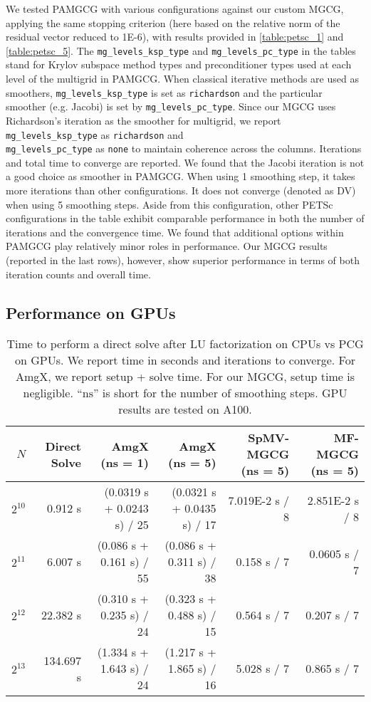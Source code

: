 We tested PAMGCG with various configurations against our custom MGCG, applying the same stopping criterion (here based on the relative norm of the residual vector reduced to 1E-6), with results provided in \autoref{table:petsc_1} and \autoref{table:petsc_5}.
The \texttt{mg\_levels\_ksp\_type} and \texttt{mg\_levels\_pc\_type} in the tables stand for Krylov subspace method types and preconditioner types used at each level of the multigrid in PAMGCG. When classical iterative methods are used as smoothers, \texttt{mg\_levels\_ksp\_type} is set as \texttt{richardson} and the particular smoother (e.g. Jacobi) is set by \texttt{mg\_levels\_pc\_type}.
Since our MGCG uses Richardson's iteration as the smoother for multigrid, we report \texttt{mg\_levels\_ksp\_type} as \texttt{richardson} and \\
\texttt{mg\_levels\_pc\_type} as \texttt{none} to maintain coherence across the columns. Iterations and total time to converge are reported.
We found that the Jacobi iteration is not a good choice as smoother in PAMGCG. 
When using 1 smoothing step, it takes more iterations than other configurations.
It does not converge (denoted as DV) when using 5 smoothing steps.
Aside from this configuration, other PETSc configurations in the table exhibit comparable performance in both the number of iterations and the convergence time. We found that additional options within PAMGCG play relatively minor roles in performance. Our MGCG results (reported in the last rows), however, show superior performance in terms of both iteration counts and overall time. 


\subsection{Performance on GPUs}
\begin{table*}
    \caption{Time to perform a direct solve after LU factorization on CPUs vs PCG on GPUs. We report time in seconds and iterations to converge. For AmgX, we report setup + solve time. For our MGCG, setup time is negligible. ``$\mathrm{ns}$'' is short for the number of smoothing steps. GPU results are tested on A100.}
    \small
    \centering
    \begin{tabular}{rrrrrr}
    \toprule
    $N$     & Direct Solve  & AmgX (ns = 1) & AmgX (ns = 5)  & SpMV-MGCG (ns = 5)   & MF-MGCG (ns = 5)\\
    \midrule
    $2^{10}$  &   0.912 s & (0.0319 s + 0.0243 s) / 25  & (0.0321 s + 0.0435 s) / 17  & 7.019E-2 s / 8   & 2.851E-2 s / 8       \\
    $2^{11}$ & 6.007 s &  (0.086 s + 0.161 s) / 55   &  (0.086 s + 0.311 s) / 38   & 0.158 s / 7  & 0.0605 s / 7     \\
    $2^{12}$ & 22.382 s  & (0.310 s + 0.235 s) / 24  &  (0.323 s + 0.488 s) / 15      & 0.564 s / 7  & 0.207 s / 7         \\
    $2^{13}$ & 134.697 s  & (1.334 s + 1.643 s) / 24   & (1.217 s + 1.865 s) / 16   & 5.028 s / 7   & 0.865 s / 7      \\
    \bottomrule
    \end{tabular}
    \label{tab:mgcg}
    
\end{table*}

